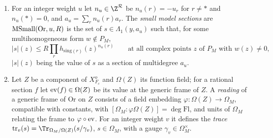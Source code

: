 \begin{definition}
\begin{enumerate}[label=(\alph*)]
primes of $S(B)$.
\item For an integer weight $u$ let $n_u\in\Z^{\mathcal R}$ be $n_u(r)=-u_r$ for $r\ne\ast$ and $n_u(\ast)=0$,
and $a_u=\sum_rn_u(r)a_r$. The \emph{small model sections} are
$\operatorname{MSmall}(\mathrm{Or},u,R)$ is the set of $s\in\Lambda_1(y,a_u)$ such that, for some multihomogeneous form
$w\notin P_M$,
\[
|s|(z)\le R\prod_rh_{\mathrm{sing}(r)}(z)^{n_u(r)}\qquad\text{at all complex points $z$ of $P_M$ with }w(z)\ne0,
\]
$|s|(z)$ being the value of $s$ as a section of multidegree $a_u$.
\item Let $Z$ be a component of $X^o_{F_c}$ and $\Omega(Z)$ its function field; for a rational section $f$ let
$\operatorname{ev}(f)\in\Omega(Z)$ be its value at the generic frame of $Z$. A \emph{reading} of a generic frame of
$\mathrm{Or}$ on $Z$ consists of a field embedding $\varphi\colon\Omega(Z)\to\Omega_M$, compatible with constants, with
$[\Omega_M:\varphi\Omega(Z)]=\deg\mathrm{Fl}$, and units of $\Omega_M$ relating the frame to $\varphi\circ\operatorname{ev}$. For an
integer weight $v$ it defines the \emph{trace} $\deepstrtr_v(s)=\Tr_{\Omega_M/\Omega(Z)}(s/\gamma_v)$, $s\in\Omega_M$, with
a gauge $\gamma_v\in\Omega_M^\times$.
\end{enumerate}
\end{definition}

